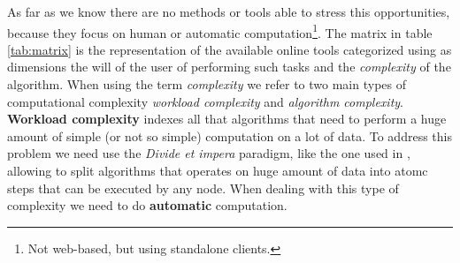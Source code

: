 
As far as we know there are no methods or tools able to stress this opportunities,
because they focus on human or automatic computation\footnote{Not web-based, but
using standalone clients.}. The matrix in table \ref{tab:matrix} is the representation
of the available online tools categorized using as dimensions the will of the user
of performing such tasks and the \emph{complexity} of the algorithm.
When using the term \emph{complexity} we refer to two main types of computational
complexity \emph{workload complexity} and \emph{algorithm complexity}.\\

\textbf{Workload complexity} indexes all that algorithms that need to perform a
huge amount of simple (or not so simple) computation on a lot of data. To address
this problem we need use the \emph{Divide et impera} paradigm, like the one used
in \cite{dean2008mapreduce}, allowing to split algorithms that operates on huge
amount of data into atomc steps that can be executed by any node. When dealing
with this type of complexity we need to do \textbf{automatic} computation.


